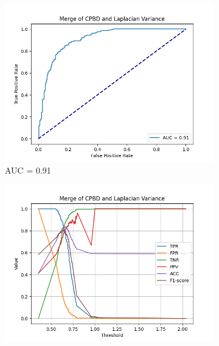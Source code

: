 \begin{figure}[H]
\begin{subfigure}[t]{0.48\textwidth}
        \includegraphics[width=\textwidth]{Figures/cpbd_lv_alpha_4_jpg/output_roc_cpbd_lv.png}
        \caption{AUC = 0.91}
    \end{subfigure}\hspace{1em}
    \begin{subfigure}[t]{0.48\textwidth}
        \includegraphics[width=\textwidth]{Figures/cpbd_lv_alpha_4_jpg/threshold_test_scores_cpbd_lv.png}
        \caption{}
    \end{subfigure}\hspace{1em}
    \caption{}
    \label{fig:CPBD_LV_jpg}
\end{figure}


